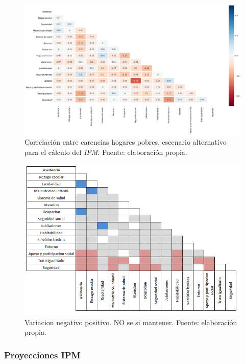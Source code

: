 \documentclass[12pt,letterpaper,spanish]{article}
\begin{document}
\begin{figure}[H]
    \centering
        \includegraphics[width=\textwidth]{Max/Heatmap_pearson_Escenario_sensibilidad_1.png}
    \caption{Correlación entre carencias hogares pobres, escenario alternativo para el cálculo del \textit{IPM}. Fuente: elaboración propia.}
    \label{heatmap_sensible}
\end{figure}


\begin{figure}[H]
    \centering
        \includegraphics[width=14cm]{Max/variacion_correlaciones.png}
    \caption{Variacion negativo positivo. NO se si mantener. Fuente: elaboración propia.}
    \label{varposneg}
\end{figure}





\subsubsection{Proyecciones IPM }
\end{document}
